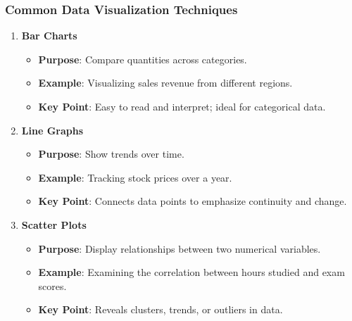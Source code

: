 \documentclass[aspectratio=169]{beamer}
\begin{document}
\begin{frame}[fragile]
  \frametitle{Common Data Visualization Techniques}
  \begin{enumerate}
    \item \textbf{Bar Charts}
      \begin{itemize}
        \item \textbf{Purpose}: Compare quantities across categories.
        \item \textbf{Example}: Visualizing sales revenue from different regions.
        \item \textbf{Key Point}: Easy to read and interpret; ideal for categorical data.
      \end{itemize}

    \item \textbf{Line Graphs}
      \begin{itemize}
        \item \textbf{Purpose}: Show trends over time.
        \item \textbf{Example}: Tracking stock prices over a year.
        \item \textbf{Key Point}: Connects data points to emphasize continuity and change.
      \end{itemize}

    \item \textbf{Scatter Plots}
      \begin{itemize}
        \item \textbf{Purpose}: Display relationships between two numerical variables.
        \item \textbf{Example}: Examining the correlation between hours studied and exam scores.
        \item \textbf{Key Point}: Reveals clusters, trends, or outliers in data.
      \end{itemize}
  \end{enumerate}
\end{frame}
\end{document}
